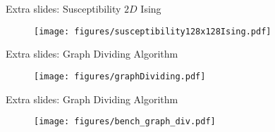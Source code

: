\documentclass[10pt]{beamer}
\begin{document}
\begin{frame}[fragile]{Extra slides: Susceptibility $2D$ Ising}
    \begin{figure}[h!]
        \centering
            \texttt{[image: figures/susceptibility128x128Ising.pdf]}
    \end{figure}
\end{frame}


\begin{frame}[fragile]{Extra slides: Graph Dividing Algorithm}
    \begin{figure}[h!]
        \centering
            \texttt{[image: figures/graphDividing.pdf]}
    \end{figure}
\end{frame}

\begin{frame}[fragile]{Extra slides: Graph Dividing Algorithm}
    \begin{figure}[h!]
        \centering
            \texttt{[image: figures/bench\_graph\_div.pdf]}
    \end{figure}
\end{frame}
\end{document}
